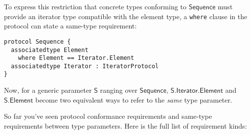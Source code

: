 \documentclass[headsepline,bibliography=totoc]{scrreport}
\newcommand{\namesym}[1]{\mathsf{#1}}
\newcommand{\genericparam}[1]{\bm{\mathsf{#1}}}
\newcommand{\proto}[1]{\bm{\mathsf{#1}}}
\theoremstyle{definition}
\theoremstyle{definition}
\theoremstyle{definition}
\begin{document}
To express this restriction that concrete types conforming to $\proto{Sequence}$ must provide an iterator type compatible with the element type, a \texttt{where} clause in the protocol can state a same-type requirement:
\begin{Verbatim}
protocol Sequence {
  associatedtype Element
    where Element == Iterator.Element
  associatedtype Iterator : IteratorProtocol
}
\end{Verbatim}
Now, for a generic parameter $\genericparam{S}$ ranging over $\proto{Sequence}$, $\genericparam{S}.\namesym{Iterator}.\namesym{Element}$ and $\genericparam{S}.\namesym{Element}$ become two equivalent ways to refer to the \emph{same} type parameter.

So far you've seen protocol conformance requirements and same-type requirements between type parameters. Here is the full list of requirement kinds:
\end{document}
